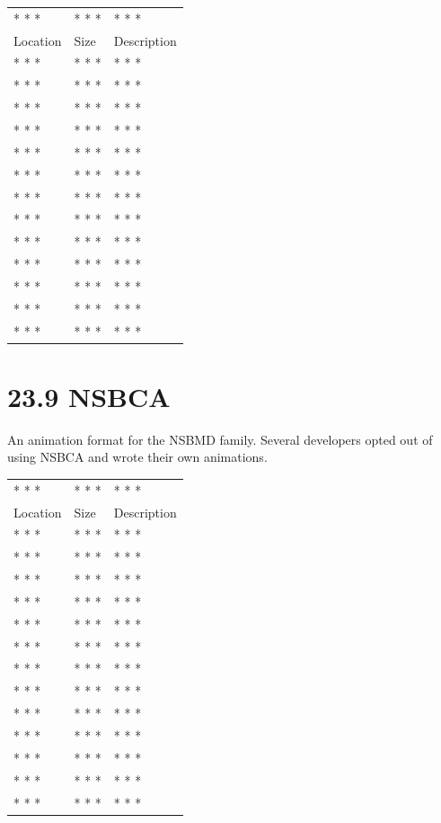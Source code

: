 \documentclass[
]{book}
\begin{document}
\begin{longtable}[]{@{}lll@{}}
\toprule()
\endhead
* * * & * * * & * * * \\
Location & Size & Description \\
* * * & * * * & * * * \\
* * * & * * * & * * * \\
* * * & * * * & * * * \\
* * * & * * * & * * * \\
* * * & * * * & * * * \\
* * * & * * * & * * * \\
* * * & * * * & * * * \\
* * * & * * * & * * * \\
* * * & * * * & * * * \\
* * * & * * * & * * * \\
* * * & * * * & * * * \\
* * * & * * * & * * * \\
* * * & * * * & * * * \\
\bottomrule()
\end{longtable}

\hypertarget{nsbca}{%
\section{23.9 NSBCA}\label{nsbca}}

An animation format for the NSBMD family. Several developers opted out of using NSBCA and wrote their own animations.

\begin{longtable}[]{@{}lll@{}}
\toprule()
\endhead
* * * & * * * & * * * \\
Location & Size & Description \\
* * * & * * * & * * * \\
* * * & * * * & * * * \\
* * * & * * * & * * * \\
* * * & * * * & * * * \\
* * * & * * * & * * * \\
* * * & * * * & * * * \\
* * * & * * * & * * * \\
* * * & * * * & * * * \\
* * * & * * * & * * * \\
* * * & * * * & * * * \\
* * * & * * * & * * * \\
* * * & * * * & * * * \\
* * * & * * * & * * * \\
\bottomrule()
\end{longtable}
\end{document}
